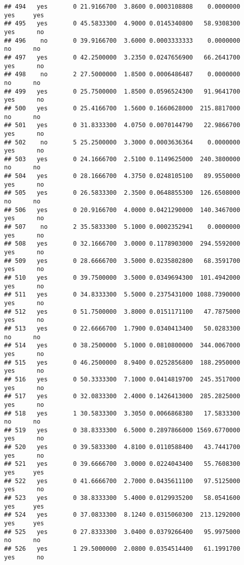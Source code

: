\documentclass[]{article}
\begin{document}
\begin{verbatim}
## 494   yes       0 21.9166700  3.8600 0.0003108808    0.0000000   yes     yes
## 495   yes       0 45.5833300  4.9000 0.0145340800   58.9308300   yes      no
## 496    no       0 39.9166700  3.6000 0.0003333333    0.0000000    no      no
## 497   yes       0 42.2500000  3.2350 0.0247656900   66.2641700   yes      no
## 498    no       2 27.5000000  1.8500 0.0006486487    0.0000000    no      no
## 499   yes       0 25.7500000  1.8500 0.0596524300   91.9641700   yes      no
## 500   yes       0 25.4166700  1.5600 0.1660628000  215.8817000    no      no
## 501   yes       0 31.8333300  4.0750 0.0070144790   22.9866700   yes      no
## 502    no       5 25.2500000  3.3000 0.0003636364    0.0000000   yes      no
## 503   yes       0 24.1666700  2.5100 0.1149625000  240.3800000    no      no
## 504   yes       0 28.1666700  4.3750 0.0248105100   89.9550000   yes      no
## 505   yes       0 26.5833300  2.3500 0.0648855300  126.6508000    no      no
## 506   yes       0 20.9166700  4.0000 0.0421290000  140.3467000   yes      no
## 507    no       2 35.5833300  5.1000 0.0002352941    0.0000000   yes      no
## 508   yes       0 32.1666700  3.0000 0.1178903000  294.5592000   yes      no
## 509   yes       0 28.6666700  3.5000 0.0235802800   68.3591700   yes      no
## 510   yes       0 39.7500000  3.5000 0.0349694300  101.4942000   yes      no
## 511   yes       0 34.8333300  5.5000 0.2375431000 1088.7390000   yes      no
## 512   yes       0 51.7500000  3.8000 0.0151171100   47.7875000   yes      no
## 513   yes       0 22.6666700  1.7900 0.0340413400   50.0283300    no      no
## 514   yes       0 38.2500000  5.1000 0.0810800000  344.0067000   yes      no
## 515   yes       0 46.2500000  8.9400 0.0252856800  188.2950000   yes      no
## 516   yes       0 50.3333300  7.1000 0.0414819700  245.3517000   yes      no
## 517   yes       0 32.0833300  2.4000 0.1426413000  285.2825000   yes      no
## 518   yes       1 30.5833300  3.3050 0.0066868380   17.5833300    no      no
## 519   yes       0 38.8333300  6.5000 0.2897866000 1569.6770000   yes      no
## 520   yes       0 39.5833300  4.8100 0.0110588400   43.7441700   yes      no
## 521   yes       0 39.6666700  3.0000 0.0224043400   55.7608300   yes     yes
## 522   yes       0 41.6666700  2.7000 0.0435611100   97.5125000   yes      no
## 523   yes       0 38.8333300  5.4000 0.0129935200   58.0541600   yes     yes
## 524   yes       0 37.0833300  8.1240 0.0315060300  213.1292000   yes     yes
## 525   yes       0 27.8333300  3.0400 0.0379266400   95.9975000    no      no
## 526   yes       1 29.5000000  2.0800 0.0354514400   61.1991700   yes      no

\end{verbatim}
\end{document}

